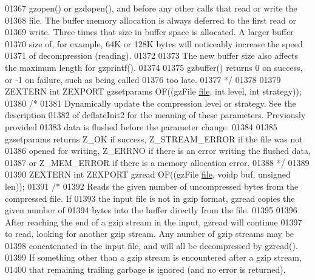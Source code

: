 \begin{DoxyCode}
01367 \textcolor{comment}{   gzopen() or gzdopen(), and before any other calls that read or write the}
01368 \textcolor{comment}{   file.  The buffer memory allocation is always deferred to the first read or}
01369 \textcolor{comment}{   write.  Three times that size in buffer space is allocated.  A larger buffer}
01370 \textcolor{comment}{   size of, for example, 64K or 128K bytes will noticeably increase the speed}
01371 \textcolor{comment}{   of decompression (reading).}
01372 \textcolor{comment}{}
01373 \textcolor{comment}{     The new buffer size also affects the maximum length for gzprintf().}
01374 \textcolor{comment}{}
01375 \textcolor{comment}{     gzbuffer() returns 0 on success, or -1 on failure, such as being called}
01376 \textcolor{comment}{   too late.}
01377 \textcolor{comment}{*/}
01378 
01379 ZEXTERN \textcolor{keywordtype}{int} ZEXPORT gzsetparams OF((gzFile \hyperlink{structfile}{file}, \textcolor{keywordtype}{int} level, \textcolor{keywordtype}{int} strategy));
01380 \textcolor{comment}{/*}
01381 \textcolor{comment}{     Dynamically update the compression level or strategy.  See the description}
01382 \textcolor{comment}{   of deflateInit2 for the meaning of these parameters.  Previously provided}
01383 \textcolor{comment}{   data is flushed before the parameter change.}
01384 \textcolor{comment}{}
01385 \textcolor{comment}{     gzsetparams returns Z\_OK if success, Z\_STREAM\_ERROR if the file was not}
01386 \textcolor{comment}{   opened for writing, Z\_ERRNO if there is an error writing the flushed data,}
01387 \textcolor{comment}{   or Z\_MEM\_ERROR if there is a memory allocation error.}
01388 \textcolor{comment}{*/}
01389 
01390 ZEXTERN \textcolor{keywordtype}{int} ZEXPORT gzread OF((gzFile \hyperlink{structfile}{file}, voidp buf, \textcolor{keywordtype}{unsigned} len));
01391 \textcolor{comment}{/*}
01392 \textcolor{comment}{     Reads the given number of uncompressed bytes from the compressed file.  If}
01393 \textcolor{comment}{   the input file is not in gzip format, gzread copies the given number of}
01394 \textcolor{comment}{   bytes into the buffer directly from the file.}
01395 \textcolor{comment}{}
01396 \textcolor{comment}{     After reaching the end of a gzip stream in the input, gzread will continue}
01397 \textcolor{comment}{   to read, looking for another gzip stream.  Any number of gzip streams may be}
01398 \textcolor{comment}{   concatenated in the input file, and will all be decompressed by gzread().}
01399 \textcolor{comment}{   If something other than a gzip stream is encountered after a gzip stream,}
01400 \textcolor{comment}{   that remaining trailing garbage is ignored (and no error is returned).}

\end{DoxyCode}
